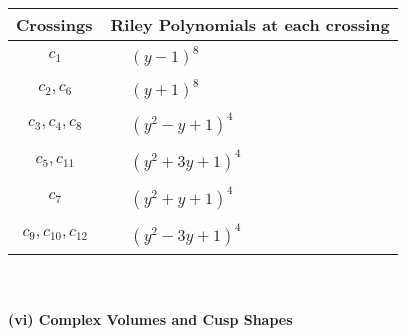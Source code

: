 \documentclass[1p]{elsarticle_modified}
\theoremstyle{definition}
\begin{document}
\begin{tabular}{m{50pt}|m{274pt}}
Crossings & \hspace{64pt}Riley Polynomials at each crossing \\
\hline $$\begin{aligned}c_{1}\end{aligned}$$&$\begin{aligned}
&(y-1)^8
\end{aligned}$\\
\hline $$\begin{aligned}c_{2},c_{6}\end{aligned}$$&$\begin{aligned}
&(y+1)^8
\end{aligned}$\\
\hline $$\begin{aligned}c_{3},c_{4},c_{8}\end{aligned}$$&$\begin{aligned}
&(y^2- y+1)^4
\end{aligned}$\\
\hline $$\begin{aligned}c_{5},c_{11}\end{aligned}$$&$\begin{aligned}
&(y^2+3 y+1)^4
\end{aligned}$\\
\hline $$\begin{aligned}c_{7}\end{aligned}$$&$\begin{aligned}
&(y^2+y+1)^4
\end{aligned}$\\
\hline $$\begin{aligned}c_{9},c_{10},c_{12}\end{aligned}$$&$\begin{aligned}
&(y^2-3 y+1)^4
\end{aligned}$\\
\hline
\end{tabular}\\~\\
\newpage\flushleft \textbf{(vi) Complex Volumes and Cusp Shapes}
\end{document}

